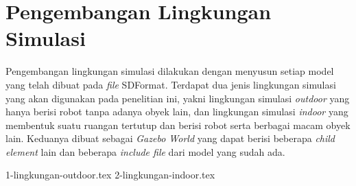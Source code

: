 \section{Pengembangan Lingkungan Simulasi}
\label{sec:lingkungansimulasi}

Pengembangan lingkungan simulasi dilakukan dengan menyusun setiap model yang telah dibuat pada \emph{file} SDFormat.
Terdapat dua jenis lingkungan simulasi yang akan digunakan pada penelitian ini,
  yakni lingkungan simulasi \emph{outdoor} yang hanya berisi robot tanpa adanya obyek lain,
  dan lingkungan simulasi \emph{indoor} yang membentuk suatu ruangan tertutup dan berisi robot serta berbagai macam obyek lain.
Keduanya dibuat sebagai \emph{Gazebo World} yang dapat berisi beberapa \emph{child element} lain dan beberapa \emph{include file} dari model yang sudah ada.

{1-lingkungan-outdoor.tex}
{2-lingkungan-indoor.tex}
